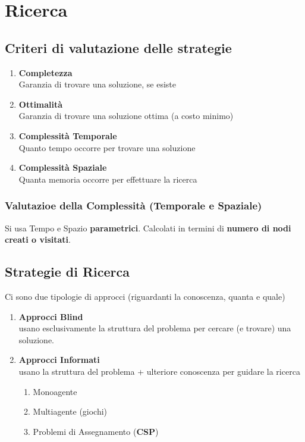 \documentclass[14pt]{extarticle}
\begin{document}
\section{Ricerca}
\subsection{Criteri di valutazione delle strategie}
\begin{enumerate}
    \item \textbf{Completezza}\\
            Garanzia di trovare una soluzione, se esiste
    \item \textbf{Ottimalità}\\
            Garanzia di trovare una soluzione ottima (a costo minimo)
    \item \textbf{Complessità Temporale}\\
            Quanto tempo occorre per trovare una soluzione
    \item \textbf{Complessità Spaziale}\\
            Quanta memoria occorre per effettuare la ricerca
\end{enumerate}
\subsubsection{Valutazioe della Complessità (Temporale e Spaziale)}
Si usa Tempo e Spazio \textbf{parametrici}. Calcolati in termini di \textbf{numero di nodi creati o visitati}.
\subsection{Strategie di Ricerca}
Ci sono due tipologie di approcci (riguardanti la conoscenza, quanta e quale)
\begin{enumerate}
    \item \textbf{Approcci Blind}\\
        usano esclusivamente la struttura del problema per cercare (e trovare) una soluzione.
    \item \textbf{Approcci Informati}\\
        usano la struttura del problema + ulteriore conoscenza per guidare la ricerca
        \begin{enumerate}
            \item Monoagente
            \item Multiagente (giochi)
            \item Problemi di Assegnamento (\textbf{CSP})
        \end{enumerate}
\end{enumerate}
\end{document}
